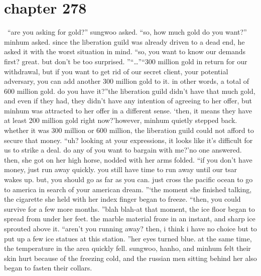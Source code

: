 \section{chapter 278}






 “are you asking for gold?” sungwoo asked.
“so, how much gold do you want?” minhum asked.
 since the liberation guild was already driven to a dead end, he asked it with the worst situation in mind.
“so, you want to know our demands first? great.
 but don’t be too surprised.
”“…”“300 million gold in return for our withdrawal, but if you want to get rid of our secret client, your potential adversary, you can add another 300 million gold to it.
 in other words, a total of 600 million gold.
 do you have it?”the liberation guild didn’t have that much gold, and even if they had, they didn’t have any intention of agreeing to her offer, but minhum was attracted to her offer in a different sense.
‘then, it means they have at least 200 million gold right now?’however, minhum quietly stepped back.
 whether it was 300 million or 600 million, the liberation guild could not afford to secure that money.
“uh? looking at your expressions, it looks like it’s difficult for us to strike a deal.
 do any of you want to bargain with me?’no one answered.
 then, she got on her high horse, nodded with her arms folded.
“if you don’t have money, just run away quickly.
 you still have time to run away until our tsar wakes up.
 but, you should go as far as you can.
 just cross the pacific ocean to go to america in search of your american dream.
”‘the moment she finished talking, the cigarette she held with her index finger began to freeze.
“then, you could survive for a few more months.
”blah blah-at that moment, the ice floor began to spread from under her feet.
 the marble material froze in an instant, and sharp ice sprouted above it.
“aren’t you running away? then, i think i have no choice but to put up a few ice statues at this station.
”her eyes turned blue.
 at the same time, the temperature in the area quickly fell.
sungwoo, hanho, and minhum felt their skin hurt because of the freezing cold, and the russian men sitting behind her also began to fasten their collars.

